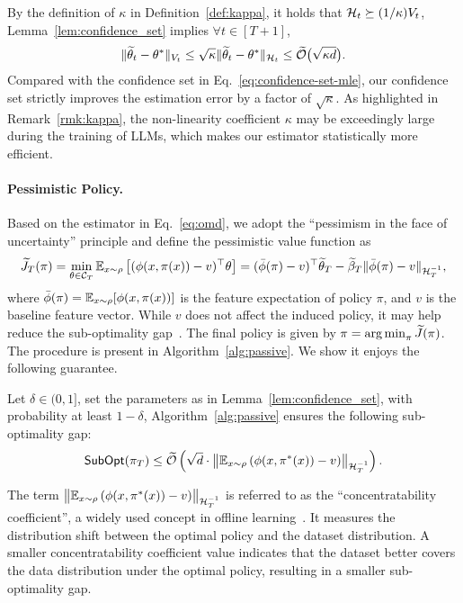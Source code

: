 By the definition of $\kappa$ in Definition~\ref{def:kappa}, it holds that $\mathcal{H}_t \succeq  (1/\kappa) V_t$, Lemma~\ref{lem:confidence_set} implies $\forall t \in [T+1]$,
\begin{align}
  \label{eq:comparison-confidence-set}
  \lVert\widetilde{\theta}_t - \theta^*\rVert_{V_t} \leq \sqrt{\kappa} \lVert\widetilde{\theta}_t - \theta^*\rVert_{\mathcal{H}_t} \leq \widetilde{\mathcal{O}} \big(\sqrt{\kappa d}\big).
\end{align}
Compared with the confidence set in Eq.~\eqref{eq:confidence-set-mle}, our confidence set strictly improves the estimation error by a factor of $\sqrt{\kappa}$. As highlighted in Remark~\ref{rmk:kappa}, the non-linearity coefficient $\kappa$ may be exceedingly large during the training of LLMs, which makes our estimator statistically more efficient.

\paragraph{Pessimistic Policy.} Based on the estimator in Eq.~\eqref{eq:omd}, we adopt the ``pessimism in the face of uncertainty'' principle and define the pessimistic value function as 
\begin{align}
  \widetilde{J}_T(\pi) = \min_{\theta \in \mathcal{C}_T} \mathbb{E}_{x \sim \rho}\left[(\phi(x, \pi(x)) - v)^\top \theta \right] = (\bar{\phi}(\pi) - v)^\top \widetilde{\theta}_T  - \widetilde{\beta}_T \lVert\bar{\phi}(\pi) - v\rVert_{\mathcal{H}_T^{-1}},\label{eq:pessimistic}
\end{align}
where $\bar{\phi}(\pi) = \mathbb{E}_{x \sim \rho}[\phi(x, \pi(x))]$ is the feature expectation of policy $\pi$, and $v$ is the baseline feature vector. While $v$ does not affect the induced policy, it may help reduce the sub-optimality gap~\citep{ICML'23:Zhu-Principled}. The final policy is given by $\pi = \operatorname*{arg\,min}_{\pi} \widetilde{J}(\pi)$. The procedure is present in Algorithm~\ref{alg:passive}. We show it enjoys the following guarantee.


\begin{myThm}
  \label{thm:passive}
  Let $\delta \in(0,1]$, set the parameters as in Lemma~\ref{lem:confidence_set}, with probability at least $1-\delta$, Algorithm~\ref{alg:passive} ensures the following sub-optimality gap:
  \begin{align*}
    {\subopt}(\pi_T) \leq \Ot \left(\sqrt{d} \cdot \bignorm{\mathbb{E}_{x \sim \rho} \left(\phi(x,\pi^*(x))-v\right)}_{\H_{T}^{-1}} \right).
  \end{align*}
\end{myThm}
\begin{myRemark}
  The term $\bignorm{\mathbb{E}_{x \sim \rho} \left(\phi(x,\pi^*(x))-v\right)}_{\H_{T}^{-1}}$ is referred to as the ``concentratability coefficient'', a widely used concept in offline learning~\citep{ICML'21:Jin-Pessimism,ICML'23:Zhu-Principled}. It measures the distribution shift between the optimal policy and the dataset distribution. A smaller concentratability coefficient value indicates that the dataset better covers the data distribution under the optimal policy, resulting in a smaller sub-optimality gap.
\end{myRemark}

